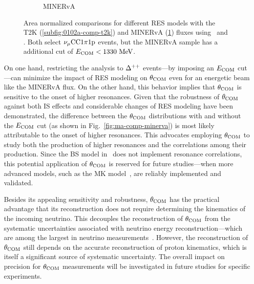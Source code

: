 \begin{figure}
\begin{subfigure}[b]{\dbfigwid\textwidth}
          \caption{MINERvA}
          \label{subfig:0102a-comp-minerva}
     \end{subfigure}
     \caption{Area normalized comparisons for different RES models with the T2K (\ref{subfig:0102a-comp-t2k}) and MINERvA (\ref{subfig:0102a-comp-minerva}) fluxes using \geoa\ and \getwoa.
     Both select $\nu_{\mu}\textrm{CC}1\pi1\textrm{p}$ events, but the MINERvA sample has a additional cut of $E_{\textrm{COM}}<1330~\textrm{MeV}$.}
     \label{fig:0102a-comp}
     \end{figure}

     On one hand, restricting the analysis to $\Delta^{++}$ events—by imposing an $E_{\textrm{COM}}$ cut—can minimize the impact of RES modeling on $\theta_{\textrm{COM}}$ even for an energetic beam like the MINERvA flux.
     On the other hand, this behavior implies that $\theta_{\textrm{COM}}$ is sensitive to the onset of higher resonances.
     Given that the robustness of $\theta_{\textrm{COM}}$ against both IS effects and considerable changes of RES modeling have been demonstrated, the difference between the $\theta_{\textrm{COM}}$ distributions with and without the $E_{\textrm{COM}}$ cut (as shown in Fig.~\ref{fig:ma-comp-minerva}) is most likely attributable to the onset of higher resonances.
     This advocates employing $\theta_{\textrm{COM}}$ to study both the production of higher resonances and the correlations among their production.
     Since the BS model in \genie\ does not implement resonance correlations, this potential application of $\theta_{\textrm{COM}}$ is reserved for future studies—when more advanced models, such as the MK model~\cite{Kabirnezhad:2017jmf,Kabirnezhad:2020wtp,Kabirnezhad:2022znc}, are reliably implemented and validated.

     Besides its appealing sensitivity and robustness, $\theta_{\textrm{COM}}$ has the practical advantage that its reconstruction does not require determining the kinematics of the incoming neutrino.
     This decouples the reconstruction of $\theta_{\textrm{COM}}$ from the systematic uncertainties associated with neutrino energy reconstruction—which are among the largest in neutrino measurements~\cite{T2K:2019yqu,T2K:2021naz,MicroBooNECollaboration:2024gvg,NOvA:2023uxq,MINERvA:2022djk}.
     However, the reconstruction of $\theta_{\textrm{COM}}$ still depends on the accurate reconstruction of proton kinematics, which is itself a significant source of systematic uncertainty.
     The overall impact on precision for $\theta_{\textrm{COM}}$ measurements will be investigated in future studies for specific experiments.

